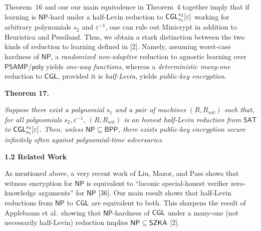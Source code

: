 \documentclass[10pt,a4paper]{article}
\begin{document}
Theorem 16 and our our main equivalence in Theorem 4 together imply that if learning is ${\mathsf{NP}}$-hard under a half-Levin reduction to ${\sf CGL}_{s_{1}}^{s_{2}}[\varepsilon]$ working for arbitrary polynomials $s_{2}$ and $\varepsilon^{-1}$, one can rule out Minicrypt in addition to Heuristica and Pessiland. Thus, we obtain a stark distinction between the two kinds of reduction to learning defined in [2]. Namely, assuming worst-case hardness of ${\mathsf{NP}}$, a \emph{randomized non-adaptive} reduction to agnostic learning over ${\mathsf{P}}{\mathsf{SAMP}}/{\mathsf{poly}}$ yields \emph{one-way functions}, whereas a \emph{deterministic many-one} reduction to ${\sf CGL}$, provided it is \emph{half-Levin}, yields \emph{public-key encryption}.\par





\par\medskip\noindent\textbf{
\textbf{Theorem 17}\textbf{.}
}\par



\emph{Suppose there exist a polynomial $s_{1}$ and a pair of machines $(R,R_{wit})$ such that, for all polynomials $s_{2},\varepsilon^{-1}$, $(R,R_{wit})$ is an honest half-Levin reduction from ${\mathsf{SAT}}$ to ${\sf CGL}^{s_{2}}_{s_{1}}[\varepsilon]$. Then, unless ${\mathsf{NP}}\subseteq{\mathsf{BPP}}$, there exists public-key encryption secure infinitely often against polynomial-time adversaries.}\par








\par\medskip\noindent\textbf{
1.2 Related Work}\par




As mentioned above, a very recent work of Liu, Mazor, and Pass shows that witness encryption for ${\mathsf{NP}}$ is equivalent to “laconic special-honest
verifier zero-knowledge arguments” for ${\mathsf{NP}}$ [36]. Our main result shows that half-Levin reductions from ${\mathsf{NP}}$ to ${\sf CGL}$ are equivalent to both. This sharpens the result of Applebaum et al. showing that ${\mathsf{NP}}$-hardness of ${\sf CGL}$ under a many-one (not necessarily half-Levin) reduction implies ${\mathsf{NP}}\subseteq{\sf SZKA}$ [2].\par
\end{document}
